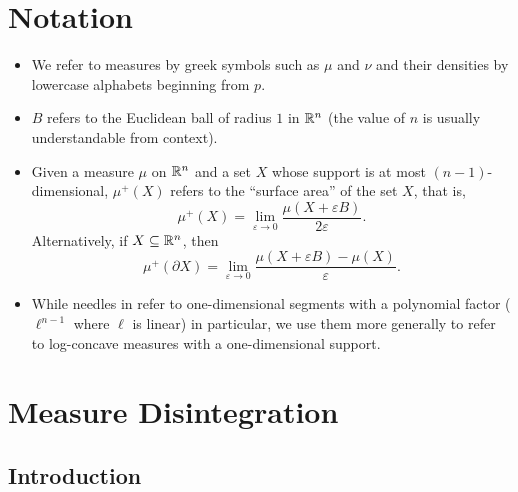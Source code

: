\documentclass{article}
\begin{document}
\thispagestyle{empty}
\titleBC

\setcounter{section}{-1}

\section{Notation}

\begin{itemize}
	\item We refer to measures by greek symbols such as $\mu$ and $\nu$ and their densities by lowercase alphabets beginning from $p$.
	\item $B$ refers to the Euclidean ball of radius $1$ in $\mathbb{R}^n$ (the value of $n$ is usually understandable from context).
	\item Given a measure $\mu$ on $\mathbb{R}^n$ and a set $X$ whose support is at most $(n-1)$-dimensional, $\mu^+(X)$ refers to the ``surface area'' of the set $X$, that is,
	\[ \mu^+(X) = \lim_{\varepsilon \to 0} \frac{\mu(X + \varepsilon B )}{2\varepsilon}. \]
	Alternatively, if $X \subseteq \mathbb{R}^n$, then
	\[ \mu^+(\partial X) = \lim_{\varepsilon \to 0} \frac{\mu(X + \varepsilon B) - \mu(X)}{\varepsilon}. \]
	\item While needles in \cite{KLSConjecture} refer to one-dimensional segments with a polynomial factor ($\ell^{n-1}$ where $\ell$ is linear) in particular, we use them more generally to refer to log-concave measures with a one-dimensional support.
\end{itemize}

\section{Measure Disintegration}

\subsection{Introduction}
\end{document}
